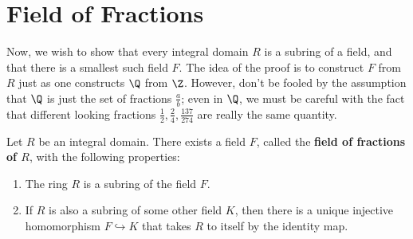 \documentclass[math1530-lecture-notes]{subfiles}
\begin{document}
\section{Field of Fractions}
Now, we wish to show that every integral domain $R$ is a subring of a field, and that there is a
smallest such field $F$. The idea of the proof is to construct $F$ from $R$ just as one constructs
$\Q$ from $\Z$. However, don't be fooled by the assumption that $\Q$ is just the set of fractions
$\frac{a}{b}$; even in $\Q$, we must be careful with the fact that different looking fractions
$\frac{1}{2},\frac{2}{4},\frac{137}{274}$ are really the same quantity.
\begin{theorem}{}
  Let $R$ be an integral domain. There exists a field $F$, called the \textbf{field of fractions of
  $R$}, with the following properties:
  \begin{enumerate}
    \item The ring $R$ is a subring of the field $F$.
    \item If $R$ is also a subring of some other field $K$, then there is a unique injective
      homomorphism $F\hookrightarrow K$ that takes $R$ to itself by the identity map.
  \end{enumerate}
\end{theorem}
\end{document}
